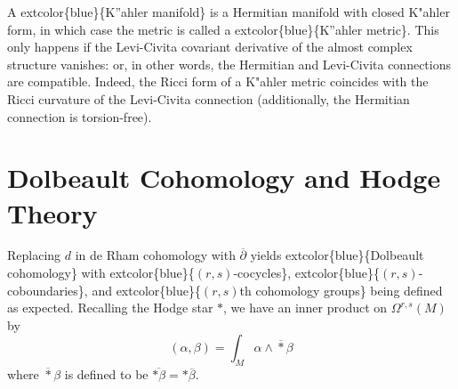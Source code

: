 \documentclass[
]{book}
\begin{document}
A extcolor\{blue\}\{K''ahler manifold\} is a Hermitian manifold with closed K"ahler form, in which case the metric is called a extcolor\{blue\}\{K''ahler metric\}.
This only happens if the Levi-Civita covariant derivative of the almost complex structure vanishes: or, in other words, the Hermitian and Levi-Civita connections are compatible.
Indeed, the Ricci form of a K"ahler metric coincides with the Ricci curvature of the Levi-Civita connection (additionally, the Hermitian connection is torsion-free).

\hypertarget{dolbeault-cohomology-and-hodge-theory}{%
\section{Dolbeault Cohomology and Hodge Theory}\label{dolbeault-cohomology-and-hodge-theory}}

Replacing \(d\) in de Rham cohomology with \(\overline{\partial}\) yields extcolor\{blue\}\{Dolbeault cohomology\} with extcolor\{blue\}\{\((r,s)\)-cocycles\}, extcolor\{blue\}\{\((r,s)\)-coboundaries\}, and extcolor\{blue\}\{\((r,s)\)th cohomology groups\} being defined as expected.
Recalling the Hodge star \(\ast\), we have an inner product on \(\Omega^{r,s}(M)\) by
\begin{equation} 
    (\alpha, \beta) = \int_M \alpha \wedge \overline{\ast} \beta
\end{equation}
where \(\overline{\ast} \beta\) is defined to be \(\overline{\ast\beta} = \ast \overline{\beta}\).
\end{document}

